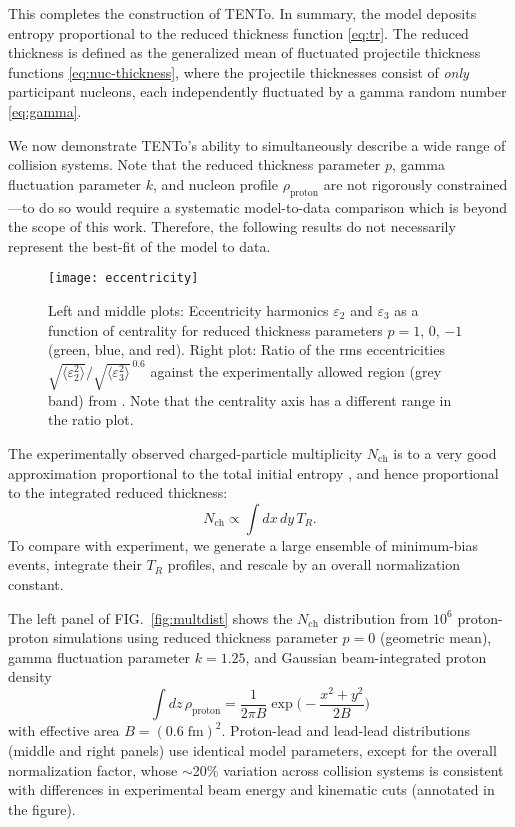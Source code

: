 \documentclass[aps,prc,reprint,amsmath,nofootinbib]{revtex4-1}
\newcommand{\psec}[1]{\phantomsection\addcontentsline{toc}{section}{#1}}
\newcommand{\trento}{T\raisebox{-.5ex}{R}ENTo}
\newcommand{\nch}{N_\text{ch}}
\newcommand{\eccratio}{\sqrt{\langle \varepsilon_2^2 \rangle}/\sqrt{\langle \varepsilon_3^2 \rangle}^{\,0.6}}
\begin{document}
This completes the construction of \trento.
In summary, the model deposits entropy proportional to the reduced thickness function \eqref{eq:tr}.
The reduced thickness is defined as the generalized mean of fluctuated projectile thickness functions \eqref{eq:nuc-thickness}, where the projectile thicknesses consist of \emph{only} participant nucleons, each independently fluctuated by a gamma random number \eqref{eq:gamma}.

\psec{Applications}

We now demonstrate \trento's ability to simultaneously describe a wide range of collision systems.
Note that the reduced thickness parameter $p$, gamma fluctuation parameter $k$, and nucleon profile $\rho_\text{proton}$ are not rigorously constrained---to do so would require a systematic model-to-data comparison which is beyond the scope of this work.
Therefore, the following results do not necessarily represent the best-fit of the model to data.

\begin{figure*}[t]
  \texttt{[image: eccentricity]}
  \caption{
    \label{fig:eccen}
    Left and middle plots:  Eccentricity harmonics $\varepsilon_2$ and $\varepsilon_3$ as a function of centrality
    for reduced thickness parameters $p = 1$, 0, $-1$ (green, blue, and red).  Right plot:  Ratio of the rms eccentricities
    $\eccratio$ against the experimentally allowed region (grey band) from \cite{Retinskaya:2013gca}.  Note that the centrality
    axis has a different range in the ratio plot.
  }
\end{figure*}

The experimentally observed charged-particle multiplicity $\nch$ is to a very good approximation proportional to the total initial entropy \cite{Song:2008si}, and hence proportional to the integrated reduced thickness:
\begin{equation}
  \nch \propto \int dx \, dy \, T_R.
\end{equation}
To compare with experiment, we generate a large ensemble of minimum-bias events, integrate their $T_R$ profiles, and rescale by an overall normalization constant.

The left panel of FIG.~\ref{fig:multdist} shows the $\nch$ distribution from $10^6$ proton-proton simulations
using reduced thickness parameter $p = 0$ (geometric mean), gamma fluctuation parameter $k = 1.25$, and
Gaussian beam-integrated proton density
\begin{equation}
  \int dz \, \rho_\text{proton} = \frac{1}{2\pi B} \exp\biggr( -\frac{x^2 + y^2}{2B} \biggr)
\end{equation}
with effective area $B = (0.6\;\text{fm})^2$.
Proton-lead and lead-lead distributions (middle and right panels) use identical model parameters, except for the overall normalization factor, whose $\sim$20\% variation across collision systems is consistent with differences in experimental beam energy and kinematic cuts (annotated in the figure).
\end{document}

